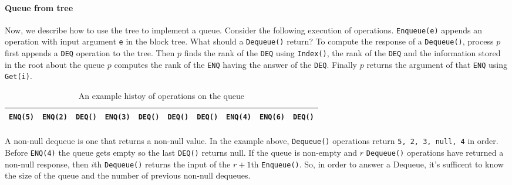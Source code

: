 \documentclass[10pt]{article}
\theoremstyle{definition}
\begin{document}
\paragraph{Queue from tree}
Now, we describe how to use the tree to implement a queue. Consider the following execution of operations. \texttt{Enqueue(e)} appends an operation with input argument \texttt{e} in the block tree. What should a \texttt{Dequeue()} return? To compute the response of a \texttt{Dequeue()}, process $p$ first appends a \texttt{DEQ} operation to the tree. Then $p$ finds the rank of the \texttt{DEQ} using \texttt{Index()}, the rank of the \texttt{DEQ} and the information stored in the root about the queue $p$ computes the rank of  the \texttt{ENQ} having the answer of the \texttt{DEQ}. Finally $p$ returns the argument of that \texttt{ENQ} using \texttt{Get(i)}.

\begin{table}[hbt]
\centering
  \begin{tabular}{c|c|c|c|c|c|c|c|c|c}
    \hline \texttt{ENQ(5)}& \texttt{ENQ(2)}& \texttt{DEQ()}& \texttt{ENQ(3)}&\texttt{DEQ()}& \texttt{DEQ()}& \texttt{DEQ()}& \texttt{ENQ(4)}& \texttt{ENQ(6)}& \texttt{DEQ()}\\ \hline
  \end{tabular}
  \caption{An example histoy of operations on the queue}
\end{table}



\paragraph{}
A non-null dequeue is one that returns a non-null value. In the example above, \texttt{Dequeue()} operations return \texttt{5, 2, 3, null, 4} in order. Before \texttt{ENQ(4)} the queue gets empty so the last \texttt{DEQ()} returns null. If the queue is non-empty and $r$ \texttt{Dequeue()} operations have returned a non-null response, then $i$th \texttt{Dequeue()} returns the input of the $r+1$th \texttt{Enqueue()}. So, in order to answer a Dequeue, it's sufficent to know the size of the queue and the number of previous non-null dequeues.



\end{document}
